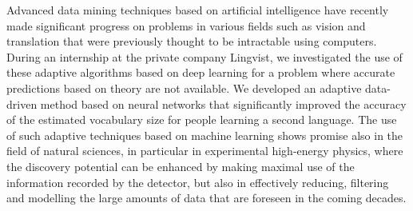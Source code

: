 Advanced data mining techniques based on artificial intelligence have recently made significant progress on problems in various fields such as vision and translation that were previously thought to be intractable using computers. During an internship at the private company Lingvist, we investigated the use of these adaptive algorithms based on deep learning for a problem where accurate predictions based on theory are not available. We developed an adaptive data-driven method based on neural networks that significantly improved the accuracy of the estimated vocabulary size for people learning a second language. The use of such adaptive techniques based on machine learning shows promise also in the field of natural sciences, in particular in experimental high-energy physics, where the discovery potential can be enhanced by making maximal use of the information recorded by the detector, but also in effectively reducing, filtering and modelling the large amounts of data that are foreseen in the coming decades.